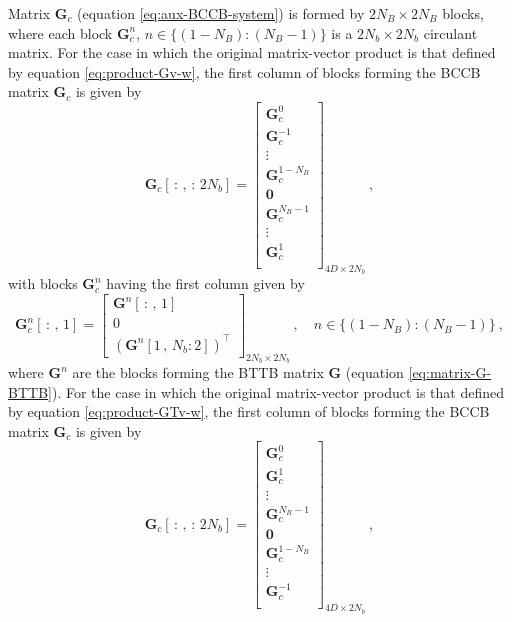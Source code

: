 Matrix $\mathbf{G}_{c}$ (equation \ref{eq:aux-BCCB-system}) is formed by $2N_{B} \times 2N_{B}$ blocks, 
where each block $\mathbf{G}_{c}^{n}$, $n \in \{(1-N_{B}):(N_{B}-1)\}$ is a $2N_{b} \times 2N_{b}$ circulant matrix.
For the case in which the original matrix-vector product is that defined by equation \ref{eq:product-Gv-w},
the first column of blocks forming the BCCB matrix $\mathbf{G}_{c}$ is given by
\begin{equation}
	\mathbf{G}_{c}[ \, : \, , \, : \, 2N_{b}] = \begin{bmatrix}
		\mathbf{G}_{c}^{0} \\
		\mathbf{G}_{c}^{-1} \\
		\vdots \\
		\mathbf{G}_{c}^{1-N_{B}} \\
		\mathbf{0} \\
		\mathbf{G}_{c}^{N_{B}-1} \\
		\vdots \\
		\mathbf{G}_{c}^{1} \\
	\end{bmatrix}_{4D \times 2N_{b}} \: ,
	\label{eq:matrix-G-BCCB-1st-block-column-G}
\end{equation}
with blocks $\mathbf{G}_{c}^{n}$ having the first column given by
\begin{equation}
	\mathbf{G}_{c}^{n}[ \, : \, , \, 1] = \begin{bmatrix}
		\mathbf{G}^{n}[ \, : \, , \, 1] \\ 
		0 \\ 
		\left( \mathbf{G}^{n}[ 1 \, , \, N_{b}:2] \right)^{\top}
	\end{bmatrix}_{2N_{b} \times 2N_{b}} \: , \quad n \in \{(1-N_{B}):(N_{B}-1)\} \: ,
	\label{eq:block-Gc-ell-1st-column-G}
\end{equation}
where $\mathbf{G}^{n}$ are the blocks forming the BTTB matrix $\mathbf{G}$ (equation \ref{eq:matrix-G-BTTB}).
For the case in which the original matrix-vector product is that defined by equation \ref{eq:product-GTv-w},
the first column of blocks forming the BCCB matrix $\mathbf{G}_{c}$ is given by
\begin{equation}
	\mathbf{G}_{c}[ \, : \, , \, : \, 2N_{b}] = \begin{bmatrix}
		\mathbf{G}_{c}^{0} \\
		\mathbf{G}_{c}^{1} \\
		\vdots \\
		\mathbf{G}_{c}^{N_{B}-1} \\
		\mathbf{0} \\
		\mathbf{G}_{c}^{1-N_{B}} \\
		\vdots \\
		\mathbf{G}_{c}^{-1} \\
	\end{bmatrix}_{4D \times 2N_{b}} \: ,
	\label{eq:matrix-G-BCCB-1st-block-column-GT}
\end{equation}
